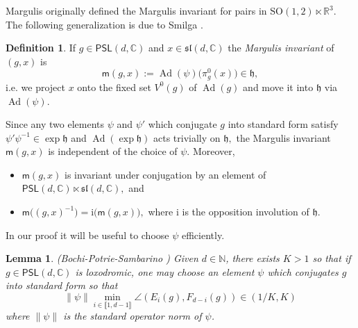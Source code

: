 \documentclass{amsart}
\theoremstyle{plain}
\newtheorem{lemma}[proposition]{Lemma}
\theoremstyle{definition}
\newtheorem{definition}[proposition]{Definition}
\theoremstyle{remark}
\newcommand{\R}{\mathbb R}
\newcommand{\Ad}{\operatorname{Ad}}
\newcommand{\PSL}{\mathsf{PSL}}
\renewcommand{\sf}[1]{{\mathsf{#1}}}
\newcommand{\lb}{\llbracket}
\newcommand{\rb}{\rrbracket}
\newcommand{\h}{{\mathfrak h}}
\newcommand{\C}{\mathbb C}
\renewcommand{\sl}{\mathfrak{sl}}
\newcommand{\<}{\left <}
\renewcommand{\>}{\right >}
\renewcommand{\C}{\mathbb C}
\begin{document}
Margulis \cite{Mar1} originally defined the  Margulis invariant for pairs in $\mathrm{SO}(1,2)\ltimes\R^3$. The following
generalization is due to Smilga \cite{Smig}.

\begin{definition}  If $g\in\PSL(d,\C)$ and $x\in\sl(d,\C)$ the \emph{Margulis invariant} of $(g,x)$ is 
$$\sf m(g,x):=\Ad(\psi)\big(\pi^0_g(x)\big)\in\h,$$ 
i.e. we project $x$ onto the fixed set  $V^0(g)$ of $\Ad(g)$ and move it into $\h$ via $\Ad(\psi).$
\end{definition}



Since  any two elements $\psi$ and $\psi'$   which conjugate $g$ into standard form  satisfy $\psi'\psi^{-1}\in\exp\h$ and $\Ad(\exp \h)$ acts trivially on $\h,$ 
the Margulis invariant $\sf m(g,x)$ is independent  of the choice of $\psi$. Moreover,
\begin{itemize}
\item[-] $\sf m(g,x)$ is invariant under conjugation by an element of $\PSL(d,\C)\ltimes\sl(d,\C),$ and
\item[-] $\sf m\big((g,x)^{-1}\big)=\mathrm{i}\big(\sf m(g,x)\big),$ where $\mathrm{i}$ is the opposition involution of $\h.$
\end{itemize}



\medskip


In our proof it will be useful to choose $\psi$ efficiently.

\begin{lemma}{\rm (Bochi-Potrie-Sambarino \cite[Proposition 7.2]{BPS})} 
\label{control-psi} 
Given $d\in\mathbb N$, 
there exists $K>1$  so that 
if $g\in\PSL(d,\C)$ is loxodromic, one may choose an element $\psi$ which conjugates $g$ into standard form so that
$$\|\psi\|\min_{i\in\lb1,d-1\rb}\angle(E_i(g),F_{d-i}(g))\in(1/K,K)$$ 
where $\|\psi\|$ is the standard operator norm of $\psi$.
\end{lemma}
\end{document}
